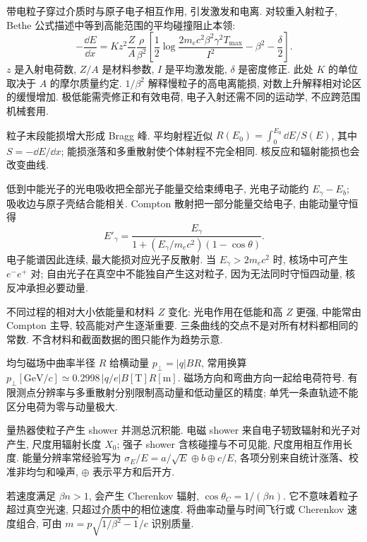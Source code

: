 \label{ch:detectors}
带电粒子穿过介质时与原子电子相互作用, 引发激发和电离. 对较重入射粒子, Bethe 公式描述中等到高能范围的平均碰撞阻止本领:
\begin{equation}
 -\frac{\dd E}{\dd x}=Kz^2\frac ZA\frac\rho{\beta^2}
 \left[\frac12\log\frac{2m_ec^2\beta^2\gamma^2T_{\max}}{I^2}-\beta^2-\frac\delta2\right].
\end{equation}
$z$ 是入射电荷数, $Z/A$ 是材料参数, $I$ 是平均激发能, $\delta$ 是密度修正. 此处 $K$ 的单位取决于 $A$ 的摩尔质量约定. $1/\beta^2$ 解释慢粒子的高电离能损, 对数上升解释相对论区的缓慢增加. 极低能需壳修正和有效电荷, 电子入射还需不同的运动学, 不应跨范围机械套用.

粒子末段能损增大形成 Bragg 峰. 平均射程近似 $R(E_0)=\int_0^{E_0}\dd E/S(E)$, 其中 $S=-\dd E/\dd x$; 能损涨落和多重散射使个体射程不完全相同. 核反应和辐射能损也会改变曲线.

低到中能光子的光电吸收把全部光子能量交给束缚电子, 光电子动能约 $E_\gamma-E_b$; 吸收边与原子壳结合能相关. Compton 散射把一部分能量交给电子, 由能动量守恒得
\begin{equation}
 E'_\gamma=\frac{E_\gamma}{1+(E_\gamma/m_ec^2)(1-\cos\theta)}.
\end{equation}
电子能谱因此连续, 最大能损对应光子反散射. 当 $E_\gamma>2m_ec^2$ 时, 核场中可产生 $e^-e^+$ 对; 自由光子在真空中不能独自产生这对粒子, 因为无法同时守恒四动量, 核反冲承担必要动量.

不同过程的相对大小依能量和材料 $Z$ 变化: 光电作用在低能和高 $Z$ 更强, 中能常由 Compton 主导, 较高能对产生逐渐重要. 三条曲线的交点不是对所有材料都相同的常数. 不含材料和截面数据的图只能作为趋势示意.

均匀磁场中曲率半径 $R$ 给横动量 $p_\perp=|q|BR$, 常用换算 $p_\perp[\mathrm{GeV}/c]\simeq0.2998\,|q/e|B[\mathrm T]R[\mathrm m]$. 磁场方向和弯曲方向一起给电荷符号. 有限测点分辨率与多重散射分别限制高动量和低动量区的精度; 单凭一条直轨迹不能区分电荷为零与动量极大.

量热器使粒子产生 shower 并测总沉积能. 电磁 shower 来自电子轫致辐射和光子对产生, 尺度用辐射长度 $X_0$; 强子 shower 含核碰撞与不可见能, 尺度用相互作用长度. 能量分辨率常经验写为 $\sigma_E/E=a/\sqrt{E}\oplus b\oplus c/E$, 各项分别来自统计涨落、校准非均匀和噪声, $\oplus$ 表示平方和后开方.

若速度满足 $\beta n>1$, 会产生 Cherenkov 辐射, $\cos\theta_C=1/(\beta n)$. 它不意味着粒子超过真空光速, 只超过介质中的相位速度. 将曲率动量与时间飞行或 Cherenkov 速度组合, 可由 $m=p\sqrt{1/\beta^2-1}/c$ 识别质量.

